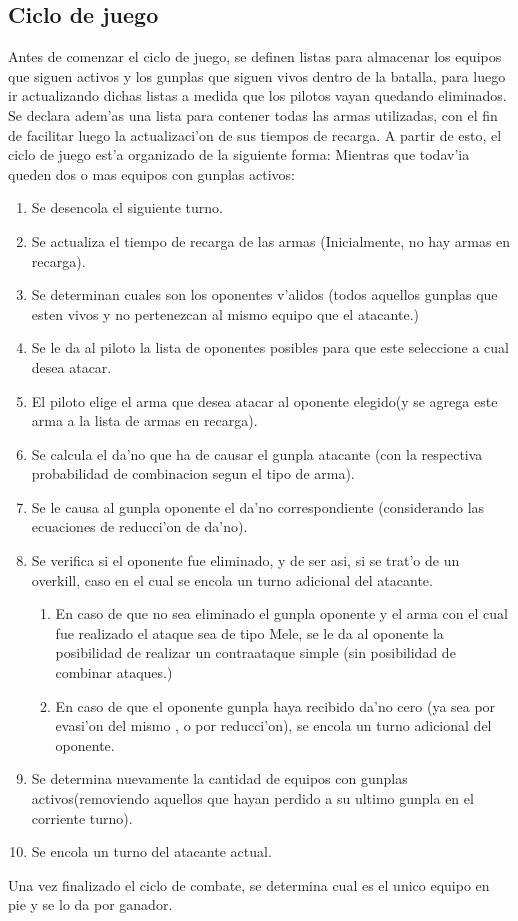 \documentclass[12pt]{article}
\begin{document}
		\subsection{Ciclo de juego}
		Antes de comenzar el ciclo de juego, se definen listas para almacenar los equipos que siguen activos y los gunplas que siguen vivos dentro de la batalla, para luego ir actualizando dichas listas a medida que los pilotos vayan quedando eliminados. Se declara adem'as una lista para contener todas las armas utilizadas, con el fin de facilitar luego la actualizaci'on de sus tiempos de recarga. A partir de esto, el ciclo de juego est'a organizado de la siguiente forma: Mientras que todav'ia queden dos o mas equipos con gunplas activos:
		\\
		\begin{enumerate}
			\item Se desencola el siguiente turno.
			\item Se actualiza el tiempo de recarga de las armas (Inicialmente, no hay armas en recarga).
			\item Se determinan cuales son los oponentes v'alidos (todos aquellos gunplas que esten vivos y no pertenezcan al mismo 
			equipo que el atacante.)
			\item Se le da al piloto la lista de oponentes posibles para que este seleccione a cual desea atacar.
			\item El piloto elige el arma que desea atacar al oponente elegido(y se agrega este arma a la lista de armas en recarga).
			\item Se calcula el da'no que ha de causar el gunpla atacante (con la respectiva probabilidad de combinacion segun el tipo de arma).
			\item Se le causa al gunpla oponente el da'no correspondiente (considerando las ecuaciones de reducci'on de da'no).
			\item Se verifica si el oponente fue eliminado, y de ser asi, si se trat'o de un overkill, caso en el cual se encola 
			un turno adicional del atacante.
			\begin{enumerate}
				\item En caso de que no sea eliminado el gunpla oponente y el arma con el cual fue realizado el ataque sea de tipo Mele,
				se le da al oponente la posibilidad de realizar un contraataque simple (sin posibilidad de combinar ataques.)
				\item En caso de que el oponente gunpla haya recibido da'no cero (ya sea por evasi'on del mismo , o por reducci'on), se
				encola un turno adicional del oponente.
			\end{enumerate}
			\item Se determina nuevamente la cantidad de equipos con gunplas activos(removiendo aquellos que hayan perdido a su ultimo gunpla en el corriente turno).
			\item Se encola un turno del atacante actual.
		\end{enumerate}
		Una vez finalizado el ciclo de combate, se determina cual es el unico equipo en pie y se lo da por ganador.
\end{document}
